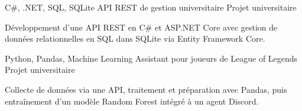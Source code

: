 
\begin{cventries}
  \cventry
    {C\#, .NET, SQL, SQLite}
    {API REST de gestion universitaire}
    {Projet universitaire}
    {}
    {
      \begin{cvitems}
        \item {Développement d’une API REST en C\# et ASP.NET Core avec gestion de données relationnelles en SQL dans SQLite via Entity Framework Core.}
      \end{cvitems}
    }

  \cventry
    {Python, Pandas, Machine Learning}
    {Assistant pour joueurs de League of Legends}
    {Projet universitaire}
    {}
    {
      \begin{cvitems}
        \item {Collecte de données via une API, traitement et préparation avec Pandas, puis entraînement d’un modèle Random Forest intégré à un agent Discord.}
      \end{cvitems}
    }
\end{cventries}
